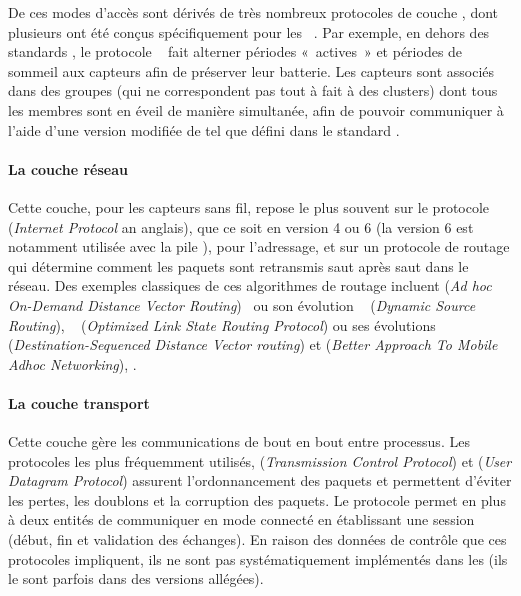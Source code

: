 
De ces modes d'accès sont dérivés de très nombreux protocoles de couche \mac, dont plusieurs ont été conçus spécifiquement pour les \rcs~\cite{YB09}.
Par exemple, en dehors des standards \ieee, le protocole \smac~\cite{YHE02} fait alterner périodes « actives » et périodes de sommeil aux capteurs afin de préserver leur batterie.
Les capteurs sont associés dans des groupes (qui ne correspondent pas tout à fait à des clusters) dont tous les membres sont en éveil de manière simultanée, afin de pouvoir communiquer à l'aide d'une version modifiée de \csmaca tel que défini dans le standard \ieeee.

            \paragraph{La couche réseau}
Cette couche, pour les capteurs sans fil, repose le plus souvent sur le protocole \ip (\textit{Internet Protocol} an anglais), que ce soit en version 4 ou 6 (la version 6 est notamment utilisée avec la pile \slowpan), pour l'adressage, et sur un protocole de routage qui détermine comment les paquets sont retransmis saut après saut dans le réseau.
Des exemples classiques de ces algorithmes de routage incluent \aodv (\textit{Ad hoc On-Demand Distance Vector Routing})~\cite{aodv} ou son évolution \dsr~\cite{dsr} (\textit{Dynamic Source Routing}), \olsr~\cite{olsr} (\textit{Optimized Link State Routing Protocol}) ou ses évolutions \dsdv (\textit{Destination-Sequenced Distance Vector routing}) et \batman (\textit{Better Approach To Mobile Adhoc Networking}), \etc.

            \paragraph{La couche transport}
Cette couche gère les communications de bout en bout entre processus.
Les protocoles les plus fréquemment utilisés, \tcp (\textit{Transmission Control Protocol}) et \udp (\textit{User Datagram Protocol}) assurent l'ordonnancement des paquets et permettent d'éviter les pertes, les doublons et la corruption des paquets.
Le protocole \tcp permet en plus à deux entités de communiquer en mode connecté en établissant une session (début, fin et validation des échanges).
En raison des données de contrôle que ces protocoles impliquent, ils ne sont pas systématiquement implémentés dans les \rcs (ils le sont parfois dans des versions allégées).

